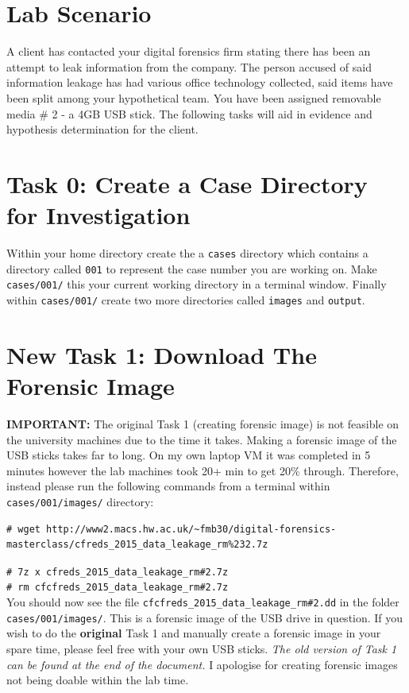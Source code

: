 \documentclass[a4paper,11pt]{article}
\begin{document}
\section{Lab Scenario}
A client has contacted your digital forensics firm stating there has been an attempt to leak information from the company. The person accused of said information leakage has had various office technology collected, said items have been split among your hypothetical team. You have been assigned removable media {\#} 2 - a 4GB USB stick. The following tasks will aid in evidence and hypothesis determination for the client.

\section{Task 0: Create a Case Directory for Investigation}
Within your home directory create the a \texttt{cases} directory which contains a directory called \texttt{001} to represent the case number you are working on. Make \texttt{cases/001/} this your current working directory in a terminal window. Finally within \texttt{cases/001/} create two more directories called \texttt{images} and \texttt{output}.

\section{New Task 1: Download The Forensic Image}\label{sec:task1-forensic-image}

\textbf{IMPORTANT:} The original Task 1 (creating forensic image) is not feasible on the university machines due to the time it takes. Making a forensic image of the USB sticks takes far to long. On my own laptop VM it was completed in 5 minutes however the lab machines took 20+ min to get 20{\%} through. Therefore, instead please run the following commands from a terminal within \texttt{cases/001/images/} directory:\\

\noindent
\begin{lstlisting}[breaklines]
# wget http://www2.macs.hw.ac.uk/~fmb30/digital-forensics-masterclass/cfreds_2015_data_leakage_rm%232.7z
\end{lstlisting}
\noindent
\verb|# 7z x cfreds_2015_data_leakage_rm#2.7z| \\
\noindent
\verb|# rm cfcfreds_2015_data_leakage_rm#2.7z|\\

You should now see the file \verb|cfcfreds_2015_data_leakage_rm#2.dd| in the folder \texttt{cases/001/images/}. This is a forensic image of the USB drive in question. If you wish to do the \textbf{original} Task 1 and manually create a forensic image in your spare time, please feel free with your own USB sticks. \textit{The old version of Task 1 can be found at the end of the document.} I apologise for creating forensic images not being doable within the lab time.
\\
\end{document}
